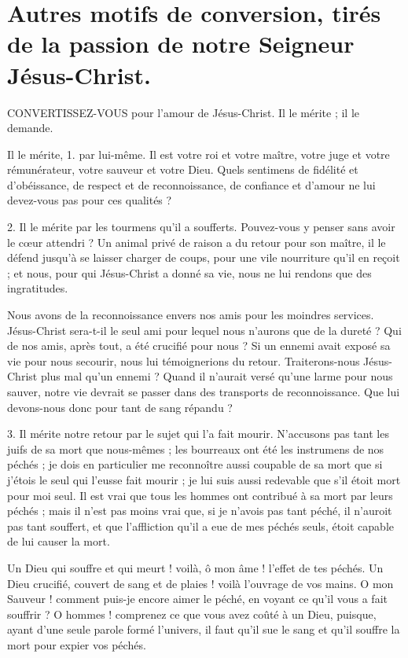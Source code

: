 \documentclass[instructions.tex]{subfiles}
\begin{document}
\chapter{Autres motifs de conversion, tirés de la passion de notre Seigneur Jésus-Christ.}

CONVERTISSEZ-VOUS pour l'amour de Jésus-Christ. Il le mérite ; il le demande.

\primo Il le mérite, 1. par lui-même. Il est votre roi et votre maître, votre juge et votre rémunérateur, votre sauveur et votre Dieu. Quels sentimens de fidélité et d'obéissance, de respect et de reconnoissance, de confiance et d'amour ne lui devez-vous pas pour ces qualités ?

2. Il le mérite par les tourmens qu'il a soufferts. Pouvez-vous y penser sans avoir le cœur attendri ? Un animal privé de raison a du retour pour son maître, il le défend jusqu'à se laisser charger de coups, pour une vile nourriture qu'il en reçoit ; et nous, pour qui Jésus-Christ a donné sa vie, nous ne lui rendons que des ingratitudes.

Nous avons de la reconnoissance envers nos amis pour les moindres services. Jésus-Christ sera-t-il le seul ami pour lequel nous n'aurons que de la dureté ? Qui de nos amis, après tout, a été crucifié pour nous ? Si un ennemi avait exposé sa vie pour nous secourir, nous lui témoignerions du retour. Traiterons-nous Jésus-Christ plus mal qu'un ennemi ? Quand il n'aurait versé qu'une larme pour nous sauver, notre vie devrait se passer dans des transports de reconnoissance. Que lui devons-nous donc pour tant de sang répandu ?

3. Il mérite notre retour par le sujet qui l'a fait mourir. N'accusons pas tant les juifs de sa mort que nous-mêmes ; les bourreaux ont été les instrumens de nos péchés ; je dois en particulier me reconnoître aussi coupable de sa mort que si j'étois le seul qui l'eusse fait mourir ; je lui suis aussi redevable que s'il étoit mort pour moi seul. Il est vrai que tous les hommes ont contribué à sa mort par leurs péchés ; mais il n'est pas moins vrai que, si je n'avois pas tant péché, il n'auroit pas tant souffert, et que l'affliction qu'il a eue de mes péchés seuls, étoit capable de lui causer la mort.

Un Dieu qui souffre et qui meurt ! voilà, ô mon âme ! l'effet de tes péchés. Un Dieu crucifié, couvert de sang et de plaies ! voilà l'ouvrage de vos mains. O mon Sauveur ! comment puis-je encore aimer le péché, en voyant ce qu'il vous a fait souffrir ? O hommes ! comprenez ce que vous avez coûté à un Dieu, puisque, ayant d'une seule parole formé l'univers, il faut qu'il sue le sang et qu'il souffre la mort pour expier vos péchés.
\end{document}
